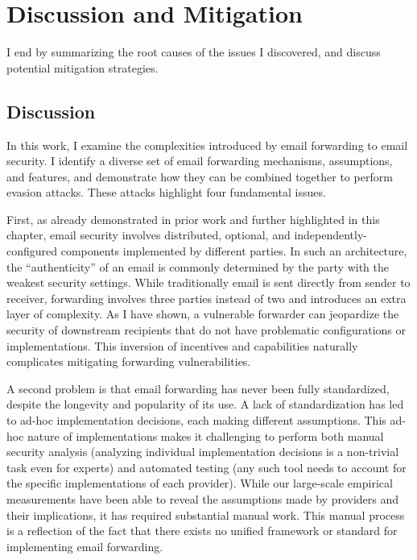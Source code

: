 \section{Discussion and Mitigation}
I end by summarizing the root causes of the issues I discovered, and discuss potential mitigation strategies.

\subsection{Discussion}
In this work, I examine the complexities introduced by email forwarding to email security. I identify a diverse set of email forwarding mechanisms, assumptions, and features, and demonstrate how they can be combined together to perform evasion attacks. These attacks highlight four fundamental issues.

First, as already demonstrated in prior work and further highlighted in this chapter, email security involves distributed, optional, and independently-configured components implemented by different parties. In such an architecture, the
``authenticity'' of an email is commonly determined by the party with the weakest security settings. While traditionally email is sent directly from sender to receiver, forwarding involves three parties instead of two and introduces an extra layer of complexity. As I have shown, a vulnerable forwarder can jeopardize the security of downstream recipients that do not have problematic configurations or implementations. This inversion of
incentives and capabilities naturally complicates
mitigating forwarding vulnerabilities.

A second problem is that email forwarding has never been fully standardized, despite the longevity and popularity of its use. A lack of standardization has led to ad-hoc implementation decisions, each making different assumptions.
This ad-hoc nature of implementations makes it challenging to perform both manual security analysis (analyzing individual implementation decisions is a non-trivial task even for experts) and automated testing (any such tool needs to account for the specific implementations of each provider).
While our large-scale empirical measurements have been able to reveal
the assumptions made by providers and their implications, it has
required substantial manual work.  This manual process is a reflection
of the fact that there exists no unified framework or standard for
implementing email forwarding.


